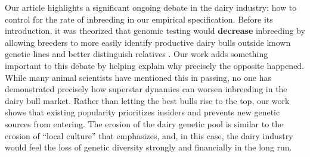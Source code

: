 \documentclass[12pt,letterpaper]{article}
\begin{document}

Our article highlights a significant ongoing debate in the dairy industry: how to control for the rate of inbreeding in our empirical specification. Before its introduction, it was theorized that genomic testing would \textbf{decrease} inbreeding by allowing breeders to more easily identify productive dairy bulls outside known genetic lines and better distinguish relatives \citep{Daetwyler2007,de2011effects}. Our work adds something important to this debate by helping explain why precisely the opposite happened. While many animal scientists have mentioned this in passing, no one has demonstrated precisely how superstar dynamics can worsen inbreeding in the dairy bull market. Rather than letting the best bulls rise to the top, our work shows that existing popularity prioritizes insiders and prevents new genetic sources from entering. The erosion of the dairy genetic pool is similar to the erosion of ``local culture'' that \citet{adler_chapter_2006} emphasizes, and, in this case, the dairy industry would feel the loss of genetic diversity strongly and financially in the long run.



\end{document}
